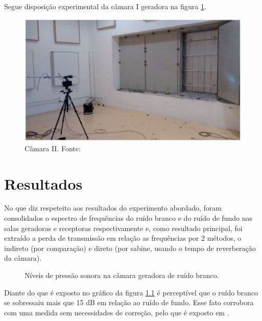 Segue disposição experimental da câmara I geradora na figura \ref{experimento_5}.
\begin{figure}[h]
	\centering
	\includegraphics[scale=0.35]{imagem_1.eps}
	\caption{Câmara II. Fonte: \cite{silva2009simulaccao}}
	\label{experimento_5}
\end{figure}

\chapter{Resultados}\label{resultados}

No que diz respeteito aos resultados do experimento abordado, foram consolidados o espectro de frequências do ruído branco e do ruído de fundo nas salas geradoras e receptoras respectivamente e, como resultado principal, foi extraído a perda de transmissão em relação as frequências por 2 métodos, o indireto (por comparação) e direto (por sabine, usando o tempo de reverberação da câmara).

\begin{figure}[h]
\hspace{-4.5cm}
\caption{Níveis de pressão sonora na câmara geradora de ruído branco.}
\label{resultado_1}
\end{figure}

Diante do que é exposto no gráfico da figura \ref{resultado_1} é perceptível que o ruído branco se sobressaiu mais que 15 dB em relação ao ruído de fundo. Esse fato corrobora com uma medida sem necessidades de correção, pelo que é exposto em \cite{silva2009simulaccao}.

